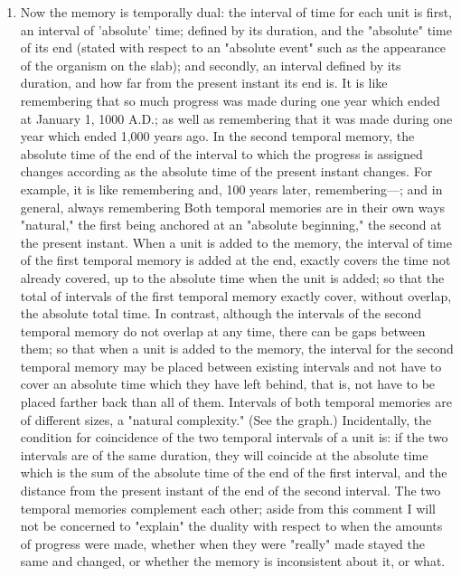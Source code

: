 \begin{enumerate}
\item Now the memory is temporally dual: the interval of time for each 
unit is first, an interval of 'absolute' time; defined by its duration, and the 
"absolute" time of its end (stated with respect to an "absolute event" such 
as the appearance of the organism on the slab); and secondly, an interval 
defined by its duration, and how far from the present instant its end is. It is 
like remembering that so much progress was made during one year which 
ended at January 1, 1000 A.D.; as well as remembering that it was made 
during one year which ended 1,000 years ago. In the second temporal 
memory, the absolute time of the end of the interval to which the progress is 
assigned changes according as the absolute time of the present instant 
changes. For example, it is like remembering  and, 100 years later, 
remembering---; and in general, always remembering  Both temporal 
memories are in their own ways "natural," the first being anchored at an 
"absolute beginning," the second at the present instant. When a unit is added 
to the memory, the interval of time of the first temporal memory is added at 
the end, exactly covers the time not already covered, up to the absolute time 
when the unit is added; so that the total of intervals of the first temporal 
memory exactly cover, without overlap, the absolute total time. In contrast, 
although the intervals of the second temporal memory do not overlap at any 
time, there can be gaps between them; so that when a unit is added to the 
memory, the interval for the second temporal memory may be placed 
between existing intervals and not have to cover an absolute time which they 
have left behind, that is, not have to be placed farther back than all of them. 
Intervals of both temporal memories are of different sizes, a "natural 
complexity." (See the graph.) Incidentally, the condition for coincidence of 
the two temporal intervals of a unit is: if the two intervals are of the same 
duration, they will coincide at the absolute time which is the sum of the 
absolute time of the end of the first interval, and the distance from the 
present instant of the end of the second interval. The two temporal 
memories complement each other; aside from this comment I will not be 
concerned to "explain" the duality with respect to when the amounts of 
progress were made, whether when they were "really" made stayed the same 
and changed, or whether the memory is inconsistent about it, or what. 


\end{enumerate}
